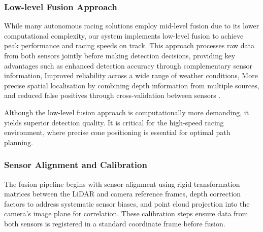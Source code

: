\documentclass[conference]{IEEEtran}
\begin{document}
\subsubsection{Low-level Fusion Approach}
While many autonomous racing solutions employ mid-level fusion due to its lower computational complexity, our system implements low-level fusion to achieve peak performance and racing speeds on track. This approach processes raw data from both sensors jointly before making detection decisions, providing key advantages such as enhanced detection accuracy through complementary sensor information, Improved reliability across a wide range of weather conditions, More precise spatial localisation by combining depth information from multiple sources, and reduced false positives through cross-validation between sensors \cite{b14}.

Although the low-level fusion approach is computationally more demanding, it yields superior detection quality. It is critical for the high-speed racing environment, where precise cone positioning is essential for optimal path planning.

\subsubsection{Sensor Alignment and Calibration}
The fusion pipeline begins with sensor alignment using rigid transformation matrices between the LiDAR and camera reference frames, depth correction factors to address systematic sensor biases, and point cloud projection into the camera's image plane for correlation. These calibration steps ensure data from both sensors is registered in a standard coordinate frame before fusion.
\end{document}
